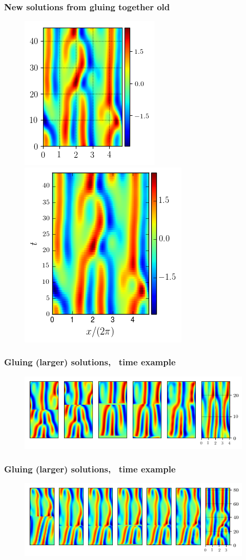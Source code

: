 \documentclass[mathserif, handout]{beamer}
\begin{document}
\begin{frame}
\frametitle{New solutions from gluing together old}
\begin{figure}
\includegraphics[width=.3\textwidth,height=.3\textheight]{MNG_ppo_tiling_final_1}
\includegraphics[width=.3\textwidth,height=.3\textheight]{MNG_ppo_L30_T44}
\end{figure}
\end{frame}

\begin{frame}%
  \frametitle{Gluing (larger) solutions, \ppo\ time example}
  \begin{figure}
  \includegraphics[width=.9\textwidth]{MNG_ppo1ppo2_time}
  \end{figure}
\end{frame}

\begin{frame}%
  \frametitle{Gluing (larger) solutions, \rpo\ time example}
  \begin{figure}
  \includegraphics[width=.9\textwidth]{MNG_rpo1rpo2_time}
  \end{figure}
\end{frame}
\end{document}
